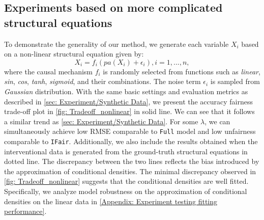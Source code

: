 \documentclass{article} %
\begin{document}
\subsection{Experiments based on more complicated structural equations} \label{Appendix: Experiment based on non-linear structural equations}

To demonstrate the generality of our method, we generate each variable $X_i$ based on a non-linear structural equation given by:
\begin{equation} \label{eq: nonlinear structual equation model}
    X_i = f_i(pa(X_i)+\epsilon_i), i=1,...,n,
\end{equation}
where the causal mechanism $f_i$ is randomly selected from functions such as \textit{linear}, \textit{sin}, \textit{cos}, \textit{tanh}, \textit{sigmoid}, and their combinations. The noise term $\epsilon_i$ is sampled from \textit{Gaussian} distribution. With the same basic settings and evaluation metrics as described in \cref{sec: Experiment/Synthetic Data}, we present the accuracy fairness trade-off plot in \cref{fig: Tradeoff_nonlinear} in solid line. We can see that it follows a similar trend as \cref{sec: Experiment/Synthetic Data}. For some $\lambda$, we can simultaneously achieve low RMSE comparable to \texttt{Full} model and low unfairness comparable to \texttt{IFair}. Additionally, we also include the results obtained when the interventional data is generated from the ground-truth structural equations in dotted line. The discrepancy between the two lines reflects the bias introduced by the approximation of conditional densities. The minimal discrepancy observed in \cref{fig: Tradeoff_nonlinear} suggests that the conditional densities are well fitted. Specifically, we analyze model robustness on the approximation of conditional densities on the linear data in \cref{Appendix: Experiment testing fitting performance}.


\end{document}
